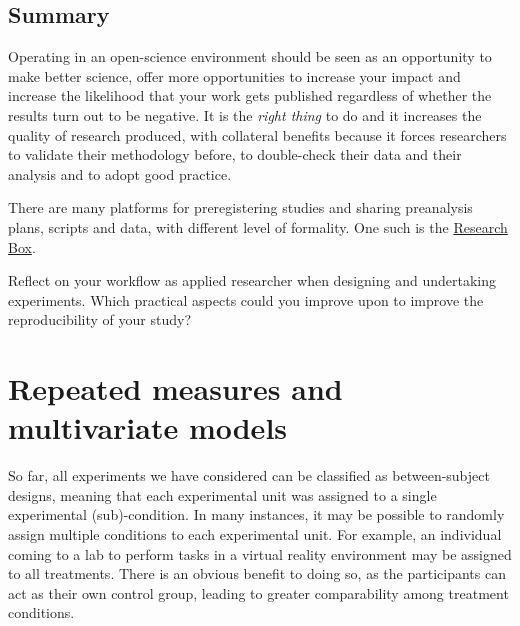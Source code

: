 \documentclass[
  11pt,
  letterpaper,
]{scrbook}
\theoremstyle{definition}
\theoremstyle{remark}
\begin{document}
\hypertarget{summary-3}{%
\section{Summary}\label{summary-3}}

Operating in an open-science environment should be seen as an
opportunity to make better science, offer more opportunities to increase
your impact and increase the likelihood that your work gets published
regardless of whether the results turn out to be negative. It is the
\emph{right thing} to do and it increases the quality of research
produced, with collateral benefits because it forces researchers to
validate their methodology before, to double-check their data and their
analysis and to adopt good practice.

There are many platforms for preregistering studies and sharing
preanalysis plans, scripts and data, with different level of formality.
One such is the \href{https://researchbox.org/}{Research Box}.

\begin{tcolorbox}[enhanced jigsaw, colback=white, coltitle=black, rightrule=.15mm, left=2mm, bottomrule=.15mm, toprule=.15mm, titlerule=0mm, colframe=quarto-callout-tip-color-frame, leftrule=.75mm, title=\textcolor{quarto-callout-tip-color}{\faLightbulb}\hspace{0.5em}{Your turn}, breakable, arc=.35mm, colbacktitle=quarto-callout-tip-color!10!white, opacitybacktitle=0.6, opacityback=0, toptitle=1mm, bottomtitle=1mm]

Reflect on your workflow as applied researcher when designing and
undertaking experiments. Which practical aspects could you improve upon
to improve the reproducibility of your study?

\end{tcolorbox}


\hypertarget{repeated-measures-and-multivariate-models}{%
\chapter{Repeated measures and multivariate
models}\label{repeated-measures-and-multivariate-models}}

So far, all experiments we have considered can be classified as
between-subject designs, meaning that each experimental unit was
assigned to a single experimental (sub)-condition. In many instances, it
may be possible to randomly assign multiple conditions to each
experimental unit. For example, an individual coming to a lab to perform
tasks in a virtual reality environment may be assigned to all
treatments. There is an obvious benefit to doing so, as the participants
can act as their own control group, leading to greater comparability
among treatment conditions.
\end{document}
